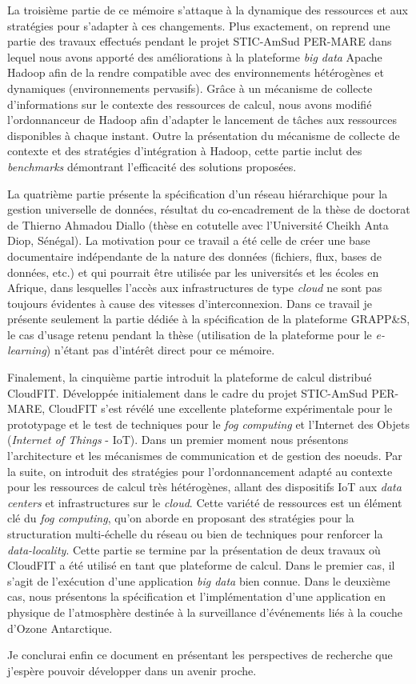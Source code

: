 La troisième partie de ce mémoire s'attaque à la dynamique des ressources et aux stratégies pour s'adapter à ces changements. Plus exactement, on reprend une partie des travaux effectués pendant le projet STIC-AmSud PER-MARE dans lequel nous avons apporté des améliorations à la plateforme \textit{big data} Apache Hadoop afin de la rendre compatible avec des environnements hétérogènes et dynamiques (environnements pervasifs). Grâce à un mécanisme de collecte d'informations sur le contexte des ressources de calcul, nous avons modifié l'ordonnanceur de Hadoop afin d'adapter le lancement de tâches aux ressources disponibles à chaque instant. Outre la présentation du mécanisme de collecte de contexte et des stratégies d'intégration à Hadoop, cette partie inclut des \textit{benchmarks} démontrant l'efficacité des solutions proposées. 

La quatrième partie présente la spécification d'un réseau hiérarchique pour la gestion universelle de données, résultat du co-encadrement de la thèse de doctorat de Thierno Ahmadou Diallo (thèse en cotutelle avec l'Université Cheikh Anta Diop, Sénégal). La motivation pour ce travail a été celle de créer une base documentaire indépendante de la nature des données (fichiers, flux, bases de données, etc.) et qui pourrait être utilisée par les universités et les écoles en Afrique, dans lesquelles l'accès aux infrastructures de type \textit{cloud} ne sont pas toujours évidentes à cause des vitesses d'interconnexion. Dans ce travail je présente seulement la partie dédiée à la spécification de la plateforme GRAPP\&S, le cas d'usage retenu pendant la thèse (utilisation de la plateforme pour le \textit{e-learning}) n'étant pas d'intérêt direct pour ce mémoire. 

Finalement, la cinquième partie introduit la plateforme de calcul distribué CloudFIT. Développée initialement dans le cadre du projet STIC-AmSud PER-MARE, CloudFIT s'est révélé une excellente plateforme expérimentale pour le prototypage et le test de techniques pour le \textit{fog computing} et l'Internet des Objets (\textit{Internet of Things} - IoT). Dans un premier moment nous présentons l'architecture et les mécanismes de communication et de gestion des n{oe}uds. Par la suite, on introduit des stratégies pour l'ordonnancement adapté au contexte pour les ressources de calcul très hétérogènes, allant des dispositifs IoT aux \textit{data centers} et infrastructures sur le \textit{cloud}. Cette variété de ressources est un élément clé du \textit{fog computing}, qu'on aborde en proposant des stratégies pour la structuration multi-échelle du réseau ou bien de techniques pour renforcer la \textit{data-locality}. Cette partie se termine par la présentation de deux travaux où CloudFIT a été utilisé en tant que plateforme de calcul. Dans le premier cas, il s'agit de l'exécution d'une application \textit{big data} bien connue. Dans le deuxième cas, nous présentons la spécification et l'implémentation d'une application en physique de l'atmosphère destinée à la surveillance d'événements liés à la couche d'Ozone Antarctique. 

Je conclurai enfin ce document en présentant les perspectives de recherche que j'espère pouvoir développer dans un avenir proche.


 

